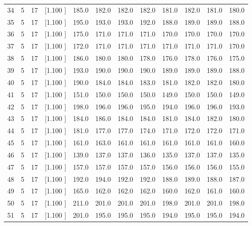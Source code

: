 \documentclass[12pt,a4paper]{article}
\begin{document}
\begin{center}
{\begin{tabular}{r r r r r r r r r r r r}
  34&  5& 17&[1.100     ]&   185.0&   182.0&   182.0&   182.0&   181.0&   182.0&   181.0&   180.0\\[-0.02in]
  35&  5& 17&[1.100     ]&   195.0&   193.0&   193.0&   192.0&   188.0&   189.0&   189.0&   188.0\\[-0.02in]
  36&  5& 17&[1.100     ]&   175.0&   171.0&   171.0&   171.0&   170.0&   170.0&   170.0&   170.0\\[-0.02in]
  37&  5& 17&[1.100     ]&   172.0&   171.0&   171.0&   171.0&   171.0&   171.0&   171.0&   170.0\\[-0.02in]
  38&  5& 17&[1.100     ]&   186.0&   180.0&   180.0&   178.0&   176.0&   178.0&   176.0&   175.0\\[-0.02in]
  39&  5& 17&[1.100     ]&   193.0&   190.0&   190.0&   190.0&   189.0&   189.0&   189.0&   188.0\\[-0.02in]
  40&  5& 17&[1.100     ]&   190.0&   184.0&   184.0&   183.0&   181.0&   182.0&   182.0&   180.0\\[-0.02in]
  41&  5& 17&[1.100     ]&   151.0&   150.0&   150.0&   150.0&   149.0&   150.0&   150.0&   149.0\\[-0.02in]
  42&  5& 17&[1.100     ]&   198.0&   196.0&   196.0&   195.0&   194.0&   196.0&   196.0&   193.0\\[-0.02in]
  43&  5& 17&[1.100     ]&   184.0&   186.0&   184.0&   184.0&   181.0&   184.0&   182.0&   180.0\\[-0.02in]
  44&  5& 17&[1.100     ]&   181.0&   177.0&   177.0&   174.0&   171.0&   172.0&   172.0&   171.0\\[-0.02in]
  45&  5& 17&[1.100     ]&   161.0&   163.0&   161.0&   161.0&   161.0&   161.0&   161.0&   160.0\\[-0.02in]
  46&  5& 17&[1.100     ]&   139.0&   137.0&   137.0&   136.0&   135.0&   137.0&   137.0&   135.0\\[-0.02in]
  47&  5& 17&[1.100     ]&   157.0&   157.0&   157.0&   157.0&   156.0&   156.0&   156.0&   155.0\\[-0.02in]
  48&  5& 17&[1.100     ]&   192.0&   194.0&   192.0&   192.0&   188.0&   189.0&   188.0&   187.0\\[-0.02in]
  49&  5& 17&[1.100     ]&   165.0&   162.0&   162.0&   162.0&   160.0&   162.0&   161.0&   160.0\\[-0.02in]
  50&  5& 17&[1.100     ]&   211.0&   201.0&   201.0&   201.0&   198.0&   201.0&   201.0&   198.0\\[-0.02in]
  51&  5& 17&[1.100     ]&   201.0&   195.0&   195.0&   195.0&   194.0&   195.0&   195.0&   194.0\\[-0.02in]

\end{tabular}}
\end{center}
\end{document}
